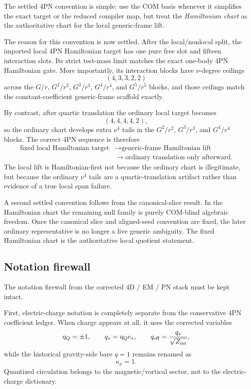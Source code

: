 \documentclass[11pt]{article}
\begin{document}
The settled $4$PN convention is simple: use the COM basis whenever it
simplifies the exact target or the reduced compiler map, but treat the
\emph{Hamiltonian chart} as the authoritative chart for the local generic-frame
lift.

The reason for this convention is now settled.  After the local/nonlocal split,
the imported local $4$PN Hamiltonian target has one pure free slot and fifteen
interaction slots.  Its strict test-mass limit matches the exact one-body $4$PN
Hamiltonian gate.  More importantly, its interaction blocks have
$\nu$-degree ceilings
\[
(4,3,3,2,2)
\]
across the $G/r$, $G^2/r^2$, $G^3/r^3$, $G^4/r^4$, and $G^5/r^5$ blocks, and
those ceilings match the constant-coefficient generic-frame scaffold exactly.

By contrast, after quartic translation the ordinary local target becomes
\[
(4,4,4,4,2),
\]
so the ordinary chart develops extra $\nu^4$ tails in the $G^2/r^2$, $G^3/r^3$,
and $G^4/r^4$ blocks.  The correct $4$PN sequence is therefore
\[
\begin{aligned}
\text{fixed local Hamiltonian target}
&\longrightarrow \text{generic-frame Hamiltonian lift}
\\
&\longrightarrow \text{ordinary translation only afterward}.
\end{aligned}
\]
The local lift is Hamiltonian-first not because the ordinary chart is
illegitimate, but because the ordinary $\nu^4$ tails are a quartic-translation
artifact rather than evidence of a true local span failure.

A second settled convention follows from the canonical-slice result.  In the
Hamiltonian chart the remaining null family is purely COM-blind algebraic
freedom.  Once the canonical slice and aligned-seed convention are fixed, the
later ordinary representative is no longer a live generic ambiguity.  The fixed
Hamiltonian chart is the authoritative local quotient statement.

\subsection{Notation firewall}
\label{sec:dictionary-firewall}

The notation firewall from the corrected $4$D / EM / PN stack must be kept
intact.

First, electric-charge notation is completely separate from the conservative
$4$PN coefficient ledger.  When charge appears at all, it uses the corrected
variables
\[
\eta_Q=\pm1,
\qquad
q_* = \eta_Q e_*,
\qquad
q_{\rm eff}=\frac{q_*}{\sqrt{Z_{\rm int}}},
\]
while the historical gravity-side bare $q=1$ remains renamed as
\[
\kappa_\rho=1.
\]
Quantized circulation belongs to the magnetic/vortical sector, not to the
electric-charge dictionary.
\end{document}
